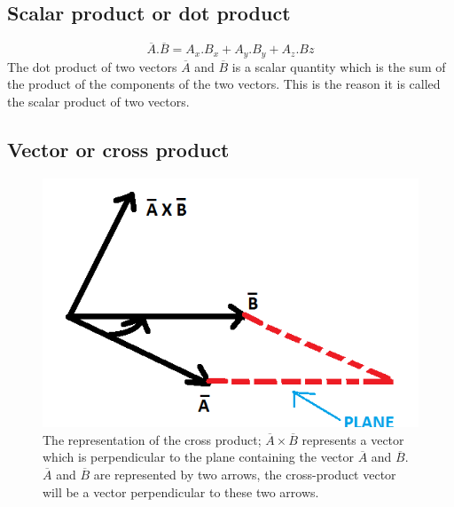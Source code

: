 \subsection{Scalar product or dot product}
\begin{equation}
\overline{A}.\overline{B} = A_{x}.B_{x} + A_{y}.B_{y} + A_{z}.B{z} 
\end{equation}
The dot product of two vectors $\overline{A}$ and $\overline{B}$ is a scalar quantity which is the sum of the product of the components of the two vectors. This is the reason it is called the scalar product of two vectors.
\subsection{Vector or cross product}
\begin{figure}[h]
\centering
\includegraphics[width=.7\linewidth]{./graphics/vector}
\caption{The representation of the cross product; $\overline{A} \times \overline{B}$ represents a vector which is perpendicular to the plane containing the vector $\overline{A}$ and $\overline{B}$. $\overline{A}$ and $\overline{B}$ are represented by two arrows, the cross-product vector will be a vector perpendicular to these two arrows.}
\end{figure}

